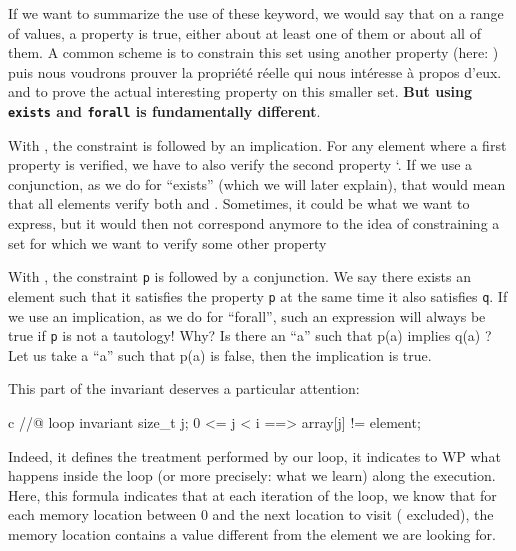 If we want to summarize the use of these keyword, we would say that on a
range of values, a property is true, either about at least one of them
or about all of them. A common scheme is to constrain this set using
another property (here: ) puis nous voudrons prouver la
propriété réelle qui nous intéresse à propos d'eux.  and to prove the
actual interesting property on this smaller set. \textbf{But using
\texttt{exists} and \texttt{forall} is fundamentally different}.



With ,
the constraint  is followed by an implication.
For any element where a first property  is verified, we have
to also verify the second property `. If we use a conjunction,
as we do for ``exists'' (which we will later explain), that would mean that
all elements verify both  and . Sometimes, it
could be what we want to express, but it would then not correspond
anymore to the idea of constraining a set for which we want to verify
some other property



With , the
constraint \texttt{p} is followed by a conjunction. We say there exists
an element such that it satisfies the property \texttt{p} at the same
time it also satisfies \texttt{q}. If we use an implication, as we do
for ``forall'', such an expression will always be true if \texttt{p} is
not a tautology! Why? Is there an ``a'' such that p(a) implies q(a) ? Let
us take a ``a'' such that p(a) is false, then the implication is true.



This part of the invariant deserves a particular attention:



\begin{CodeBlock}{c}
//@ loop invariant \forall size_t j; 0 <= j < i ==> array[j] != element;
\end{CodeBlock}



Indeed, it defines the treatment performed by our loop, it indicates to
WP what happens inside the loop (or more precisely: what we learn) along
the execution. Here, this formula indicates that at each iteration of
the loop, we know that for each memory location between 0 and the next
location to visit ( excluded), the memory location contains a
value different from the element we are looking for.

